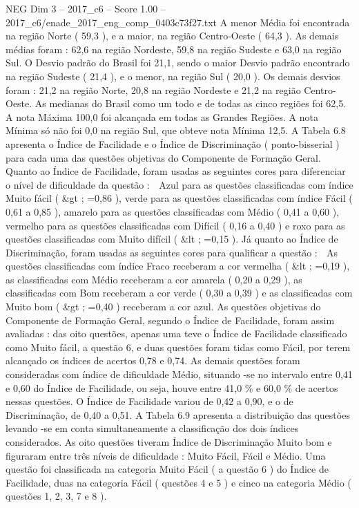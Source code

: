 \begin{textsample}{NEG Dim 3 – 2017\_c6 – Score 1.00 – 2017\_c6/enade\_2017\_eng\_comp\_0403c73f27.txt}
A menor Média foi encontrada na região Norte ( 59,3 ), e a maior, na região Centro-Oeste ( 64,3 ).
As demais médias foram : 62,6 na região Nordeste, 59,8 na região Sudeste e 63,0 na região Sul.
O Desvio padrão do Brasil foi 21,1, sendo o maior Desvio padrão encontrado na região Sudeste ( 21,4 ), e o menor, na região Sul ( 20,0 ).
Os demais desvios foram : 21,2 na região Norte, 20,8 na região Nordeste e 21,2 na região Centro-Oeste.
As medianas do Brasil como um todo e de todas as cinco regiões foi 62,5.
A nota Máxima 100,0 foi alcançada em todas as Grandes Regiões.
A nota Mínima só não foi 0,0 na região Sul, que obteve nota Mínima 12,5.
A Tabela 6.8 apresenta o Índice de Facilidade e o Índice de Discriminação ( ponto-bisserial ) para cada uma das questões objetivas do Componente de Formação Geral.
Quanto ao Índice de Facilidade, foram usadas as seguintes cores para diferenciar o nível de dificuldade da questão :  Azul para as questões classificadas com índice Muito fácil ( \&gt ; =0,86 ), verde para as questões classificadas com índice Fácil ( 0,61 a 0,85 ), amarelo para as questões classificadas com Médio ( 0,41 a 0,60 ), vermelho para as questões classificadas com Difícil ( 0,16 a 0,40 ) e roxo para as questões classificadas com Muito difícil ( \&lt ; =0,15 ).
Já quanto ao Índice de Discriminação, foram usadas as seguintes cores para qualificar a questão :  As questões classificadas com índice Fraco receberam a cor vermelha ( \&lt ; =0,19 ), as classificadas com Médio receberam a cor amarela ( 0,20 a 0,29 ), as classificadas com Bom receberam a cor verde ( 0,30 a 0,39 ) e as classificadas com Muito bom ( \&gt ; =0,40 ) receberam a cor azul.
As questões objetivas do Componente de Formação Geral, segundo o Índice de Facilidade, foram assim avaliadas : das oito questões, apenas uma teve o Índice de Facilidade classificado como Muito fácil, a questão 6, e duas questões foram tidas como Fácil, por terem alcançado os índices de acertos 0,78 e 0,74.
As demais questões foram consideradas com índice de dificuldade Médio, situando -se no intervalo entre 0,41 e 0,60 do Índice de Facilidade, ou seja, houve entre 41,0 \% e 60,0 \% de acertos nessas questões.
O Índice de Facilidade variou de 0,42 a 0,90, e o de Discriminação, de 0,40 a 0,51.
A Tabela 6.9 apresenta a distribuição das questões levando -se em conta simultaneamente a classificação dos dois índices considerados.
As oito questões tiveram Índice de Discriminação Muito bom e figuraram entre três níveis de dificuldade : Muito Fácil, Fácil e Médio.
Uma questão foi classificada na categoria Muito Fácil ( a questão 6 ) do Índice de Facilidade, duas na categoria Fácil ( questões 4 e 5 ) e cinco na categoria Médio ( questões 1, 2, 3, 7 e 8 ).

\end{textsample}
